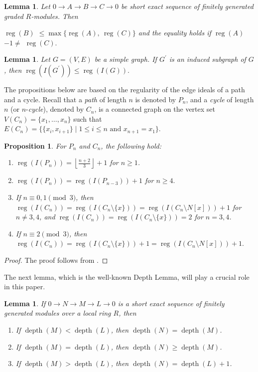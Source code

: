 \documentclass[11pt,reqno]{amsart}
\newcommand{\reg}{\operatorname{reg}}
\newtheorem{lemma}[theorem]{Lemma}
\newtheorem{proposition}[theorem]{Proposition}
\theoremstyle{definition}
\begin{document}
\begin{lemma}\cite[ Lemma 1.2]{H.T-2016}  \label{reg.4}  Let  $0  \rightarrow A \rightarrow B \rightarrow C \rightarrow 0$  be 	short exact sequence of finitely generated graded $R$-modules. Then
	\item $\reg(B)$ $\leq \max \{\reg (A),~ \reg (C)\}$ and the equality holds if $\reg(A)$ $- 1  \neq$ $\reg(C).$ 
\end{lemma}
\begin{lemma}  \cite[Lemma 3.1]{htha}\label{H<G}
	Let $G = (V, E)$ be a simple graph. If $ G^\prime $ is an induced subgraph of $ G $, then $ \reg(I(G^\prime)) \leq  \reg(I(G)). $	
\end{lemma}
The propositions below are based on the regularity of the edge ideals of a path and a cycle. Recall that a \textit{path} of length $n$ is denoted by $P_n$, and a \textit{cycle} of length $n$ (or $n$-\textit{cycle}), denoted by $C_n$, is a connected graph on the vertex set $V(C_n)=\{x_1,\ldots,x_n\}$ such that $E(C_n)=\{\{x_{i},x_{i+1}\}\mid 1\leq i\leq n \text{ and } x_{n+1}=x_1\}$.


\begin{proposition}\label{path}
For $P_n$ and $C_n$, the following hold:
\begin{enumerate}
	\item $\displaystyle \reg(I(P_n))=\left\lfloor\frac{n+2}{3}\right\rfloor + 1$ for $n \geq 1$.
	
	\item $\reg(I(P_n))=\reg(I(P_{n-3})) + 1$ for $n \geq 4.$

	\item If $n \equiv 0,1 \pmod{3}$, then 
	$\reg(I(C_n))=\reg(I(C_n \setminus \{x\}))=\reg(I(C_n \setminus N[x])) + 1$
	for $n \neq 3,4$, and $\reg(I(C_n))=\reg(I(C_n\setminus \{x\}))=2$ for $n=3,4$.
	
	\item If $n \equiv 2 \pmod{3}$, then 
	$\reg(I(C_n))=\reg(I(C_n \setminus \{x\})) + 1 = \reg(I(C_n \setminus N[x])) + 1.$
\end{enumerate}
\end{proposition}
\begin{proof}
 The proof follows from \cite[Theorem 4.7, Theorem 5.2]{beyarslan1}.
\end{proof}
The next lemma, which is the well-known Depth Lemma, will play a crucial role in this paper.       
\begin{lemma} \label{depth-lemma}
	If $0 \rightarrow N \rightarrow M \rightarrow L \rightarrow 0$ is a short exact sequence of finitely generated modules over a local ring $R$, then
	\begin{enumerate}
		\item If $\operatorname{depth}(M) < \operatorname{depth}(L)$, then $\operatorname{depth}(N) = \operatorname{depth}(M)$.
		\item If $\operatorname{depth}(M) = \operatorname{depth}(L)$, then $\operatorname{depth}(N) \geq \operatorname{depth}(M)$.
		\item If $\operatorname{depth}(M) > \operatorname{depth}(L)$, then $\operatorname{depth}(N) = \operatorname{depth}(L) + 1$.
	\end{enumerate}
\end{lemma}
\end{document}
